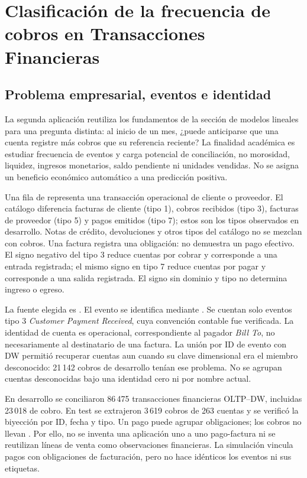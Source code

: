 \barrerapagina
\section{Clasificación de la frecuencia de cobros en Transacciones Financieras}\label{sec:transacciones}
\subsection{Problema empresarial, eventos e identidad}
La segunda aplicación reutiliza los fundamentos de la sección de modelos lineales para una pregunta distinta: al inicio de un mes, ¿puede anticiparse que una cuenta registre más cobros que su referencia reciente? La finalidad académica es estudiar frecuencia de eventos y carga potencial de conciliación, no morosidad, liquidez, ingresos monetarios, saldo pendiente ni unidades vendidas. No se asigna un beneficio económico automático a una predicción positiva.

Una fila de  representa una transacción operacional de cliente o proveedor. El catálogo diferencia facturas de cliente (tipo 1), cobros recibidos (tipo 3), facturas de proveedor (tipo 5) y pagos emitidos (tipo 7); estos son los tipos observados en desarrollo. Notas de crédito, devoluciones y otros tipos del catálogo no se mezclan con cobros. Una factura registra una obligación: no demuestra un pago efectivo. El signo negativo del tipo 3 reduce cuentas por cobrar y corresponde a una entrada registrada; el mismo signo en tipo 7 reduce cuentas por pagar y corresponde a una salida registrada. El signo sin dominio y tipo no determina ingreso o egreso.

La fuente elegida es . El evento se identifica mediante . Se cuentan solo eventos tipo 3 \emph{Customer Payment Received}, cuya convención contable fue verificada. La identidad de cuenta es  operacional, correspondiente al pagador \emph{Bill To}, no necesariamente al destinatario de una factura. La unión por ID de evento con DW permitió recuperar cuentas aun cuando su clave dimensional era el miembro desconocido: 21\,142 cobros de desarrollo tenían ese problema. No se agrupan cuentas desconocidas bajo una identidad cero ni por nombre actual.

En desarrollo se conciliaron 86\,475 transacciones financieras OLTP--DW, incluidas 23\,018 de cobro. En test se extrajeron 3\,619 cobros de 263 cuentas y se verificó la biyección por ID, fecha y tipo. Un pago puede agrupar obligaciones; los cobros no llevan . Por ello, no se inventa una aplicación uno a uno pago-factura ni se reutilizan líneas de venta como observaciones financieras. La simulación vincula pagos con obligaciones de facturación, pero no hace idénticos los eventos ni sus etiquetas.

